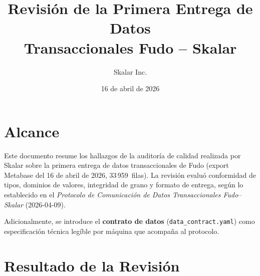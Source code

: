\documentclass[11pt,a4paper]{article}
\title{
    \vspace{-2cm}
    {\LARGE Revisi\'on de la Primera Entrega de Datos \\
    Transaccionales Fudo -- Skalar} \\[0.3cm]
}
\author{Skalar Inc.}
\date{16 de abril de 2026}
\newcommand{\code}[1]{\texttt{#1}}
\begin{document}
\maketitle
\thispagestyle{fancy}

\section{Alcance}

Este documento resume los hallazgos de la auditor\'ia de calidad realizada
por Skalar sobre la primera entrega de datos transaccionales de Fudo
(export Metabase del 16 de abril de 2026, 33\,959~filas). La revisi\'on
evalu\'o conformidad de tipos, dominios de valores, integridad de grano
y formato de entrega, seg\'un lo establecido en el \textit{Protocolo de
Comunicaci\'on de Datos Transaccionales Fudo--Skalar} (2026-04-09).

Adicionalmente, se introduce el \textbf{contrato de datos}
(\code{data\_contract.yaml}) como especificaci\'on t\'ecnica
leg\'ible por m\'aquina que acompa\~na al protocolo.

\section{Resultado de la Revisi\'on}
\end{document}
